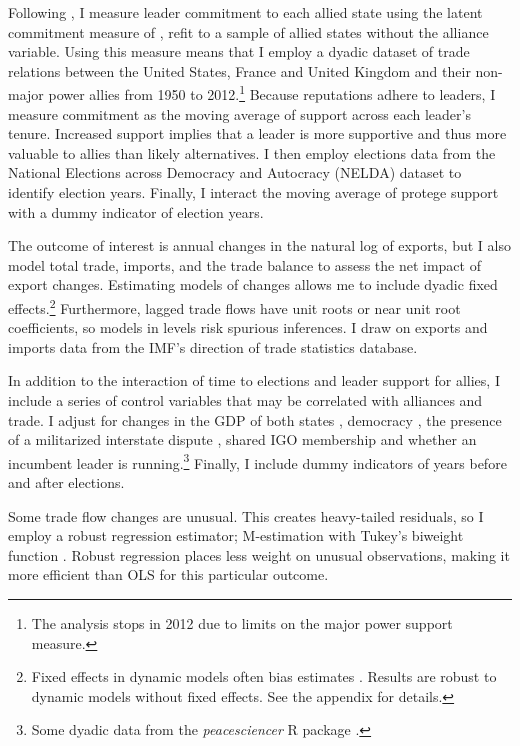 \documentclass[12pt]{article}
\begin{document}
Following \citet{DigiuseppeShea2021}, I measure leader commitment to each allied state using the latent commitment measure of \citet{McManusNieman2019}, refit to a sample of allied states without the alliance variable. 
Using this measure means that I employ a dyadic dataset of trade relations between the United States, France and United Kingdom and their non-major power allies from 1950 to 2012.\footnote{The analysis stops in 2012 due to limits on the major power support measure.}
Because reputations adhere to leaders, I measure commitment as the moving average of support across each leader's tenure. 
Increased support implies that a leader is more supportive and thus more valuable to allies than likely alternatives.
I then employ elections data from the National Elections across Democracy and Autocracy (NELDA) dataset \citep{HydeMarinov2012} to identify election years.
Finally, I interact the moving average of protege support with a dummy indicator of election years.


The outcome of interest is annual changes in the natural log of exports, but I also model total trade, imports, and the trade balance to assess the net impact of export changes.
Estimating models of changes allows me to include dyadic fixed effects.\footnote{Fixed effects in dynamic models often bias estimates \citep{Nickell1981}. Results are robust to dynamic models without fixed effects. See the appendix for details.}
Furthermore, lagged trade flows have unit roots or near unit root coefficients, so models in levels risk spurious inferences.
I draw on exports and imports data from the IMF's direction of trade statistics database.


In addition to the interaction of time to elections and leader support for allies, I include a series of control variables that may be correlated with alliances and trade. 
I adjust for changes in the GDP of both states \citep{FouquinHugot2016}, democracy \citep{Marquez2016}, the presence of a militarized interstate dispute \citep{Gibleretal2016}, shared IGO membership \citep{Pevehouseetal2020} and whether an incumbent leader is running.\footnote{Some dyadic data from the \textit{peacesciencer} \textsf{R} package \citep{peacesciencer-package}.}
Finally, I include dummy indicators of years before and after elections.


Some trade flow changes are unusual. 
This creates heavy-tailed residuals, so I employ a robust regression estimator; M-estimation with Tukey's biweight function \citep{RaineyBaissa2020}.
Robust regression places less weight on unusual observations, making it more efficient than OLS for this particular outcome.
\end{document}
